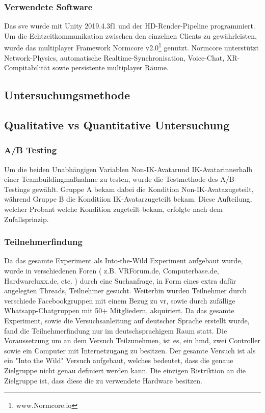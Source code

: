 \documentclass[a4paper,11pt]{article}%
\renewcommand{\\}{\vspace*{0.5\baselineskip} \newline}
\begin{document}
			\subsubsection{Verwendete Software}
Das \ac{sve} wurde mit Unity 2019.4.3f1 und der HD-Render-Pipeline programmiert. Um die Echtzeitkommunikation zwischen den einzelnen Clients zu gewährleisten, wurde das multiplayer Framework \flqq Normcore v2.0\frqq \footnote{www.Normcore.io} genutzt.
Normcore unterstützt Network-Physics, automatische Realtime-Synchronisation, Voice-Chat, XR-Compitabilität sowie persistente multiplayer Räume.
		
		\subsection{Untersuchungsmethode}
			\subsection{Qualitative vs Quantitative Untersuchung}
			
			\subsubsection{A/B Testing}
Um die beiden Unabhängigen Variablen \flqq Non-IK-Avatar\frqq und \flqq IK-Avatar\frqq innerhalb einer Teambuildingmaßnahme zu testen, wurde die Testmethode des A/B-Testings gewählt.
Gruppe A bekam dabei die Kondition \flqq Non-IK-Avata\frqq zugeteilt, während Gruppe B die Konditiion \flqq IK-Avatar\frqq zugeteilt bekam. Diese Aufteilung, welcher Probant welche Kondition zugeteilt bekam, erfolgte nach dem Zufallsprinzip. 

			\subsubsection{Teilnehmerfindung}
Da das gesamte Experiment als Into-the-Wild Experiment aufgebaut wurde, wurde in verschiedenen Foren ( z.B. VRForum.de, Computerbase.de, Hardwareluxx.de, etc. ) durch eine Suchanfrage, in Form eines extra dafür angelegten Threads, Teilnehmer gesucht. Weiterhin wurden Teilnehmer durch verschiede Facebookgruppen mit einem Bezug zu \ac{vr}, sowie durch zufällige Whatsapp-Chatgruppen mit 50+ Mitgliedern, akquiriert. Da das gesamte Experiment, sowie die Versuchsanleitung auf deutscher Sprache erstellt wurde, fand die Teilnehmerfindung nur im deutschsprachigem Raum statt.
Die Voraussetzung um an dem Versuch Teilzunehmen, ist es, ein \ac{hmd}, zwei Controller sowie ein Computer mit Internetzugang zu besitzen. Der gesamte Versuch ist als ein "Into the Wild" Versuch aufgebaut, welches bedeutet, dass die genaue Zielgruppe nicht genau definiert werden kann. Die einzigen Ristriktion an die Zielgruppe ist, dass diese die zu verwendete Hardware besitzen.\\
\end{document}
